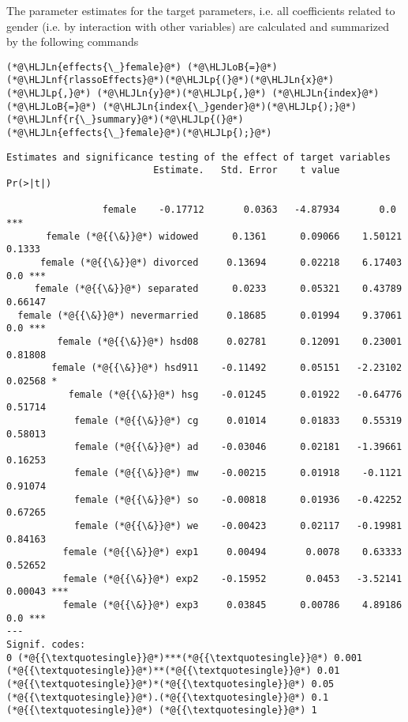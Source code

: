 \documentclass[12pt,a4paper]{article}
\newcommand{\HLJLn}[1]{#1}
\newcommand{\HLJLnf}[1]{\textcolor[RGB]{66,102,213}{#1}}
\newcommand{\HLJLoB}[1]{\textcolor[RGB]{102,102,102}{\textbf{#1}}}
\newcommand{\HLJLp}[1]{#1}
\begin{document}
The parameter estimates for the target parameters, i.e. all coefficients related to gender (i.e. by interaction with other variables) are calculated and summarized by the following commands


\begin{lstlisting}
(*@\HLJLn{effects{\_}female}@*) (*@\HLJLoB{=}@*) (*@\HLJLnf{rlassoEffects}@*)(*@\HLJLp{(}@*)(*@\HLJLn{x}@*)(*@\HLJLp{,}@*) (*@\HLJLn{y}@*)(*@\HLJLp{,}@*) (*@\HLJLn{index}@*) (*@\HLJLoB{=}@*) (*@\HLJLn{index{\_}gender}@*)(*@\HLJLp{);}@*)
(*@\HLJLnf{r{\_}summary}@*)(*@\HLJLp{(}@*)(*@\HLJLn{effects{\_}female}@*)(*@\HLJLp{);}@*)
\end{lstlisting}

\begin{lstlisting}
Estimates and significance testing of the effect of target variables
                          Estimate.   Std. Error    t value      Pr(>|t|)

                 female    -0.17712       0.0363   -4.87934       0.0 ***
       female (*@{{\&}}@*) widowed      0.1361      0.09066    1.50121       0.1333
      female (*@{{\&}}@*) divorced     0.13694      0.02218    6.17403       0.0 ***
     female (*@{{\&}}@*) separated      0.0233      0.05321    0.43789      0.66147
  female (*@{{\&}}@*) nevermarried     0.18685      0.01994    9.37061       0.0 ***
         female (*@{{\&}}@*) hsd08     0.02781      0.12091    0.23001      0.81808
        female (*@{{\&}}@*) hsd911    -0.11492      0.05151   -2.23102     0.02568 *
           female (*@{{\&}}@*) hsg    -0.01245      0.01922   -0.64776      0.51714
            female (*@{{\&}}@*) cg     0.01014      0.01833    0.55319      0.58013
            female (*@{{\&}}@*) ad    -0.03046      0.02181   -1.39661      0.16253
            female (*@{{\&}}@*) mw    -0.00215      0.01918    -0.1121      0.91074
            female (*@{{\&}}@*) so    -0.00818      0.01936   -0.42252      0.67265
            female (*@{{\&}}@*) we    -0.00423      0.02117   -0.19981      0.84163
          female (*@{{\&}}@*) exp1     0.00494       0.0078    0.63333      0.52652
          female (*@{{\&}}@*) exp2    -0.15952       0.0453   -3.52141   0.00043 ***
          female (*@{{\&}}@*) exp3     0.03845      0.00786    4.89186       0.0 ***
---
Signif. codes:
0 (*@{{\textquotesingle}}@*)***(*@{{\textquotesingle}}@*) 0.001 (*@{{\textquotesingle}}@*)**(*@{{\textquotesingle}}@*) 0.01 (*@{{\textquotesingle}}@*)*(*@{{\textquotesingle}}@*) 0.05 (*@{{\textquotesingle}}@*).(*@{{\textquotesingle}}@*) 0.1 (*@{{\textquotesingle}}@*) (*@{{\textquotesingle}}@*) 1
\end{lstlisting}
\end{document}
